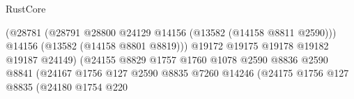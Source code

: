 \begin{lexlean}{RustCore}
\begin{coremodule}
                                                              (@28781
                                                                (@28791
                                                                  @28800
                                                                  @24129
                                                                  @14156
                                                                  (@13582 (@14158 @8811 @2590)))
                                                                @14156
                                                                (@13582 (@14158 @8801 @8819)))
                                                              @19172
                                                              @19175
                                                              @19178
                                                              @19182
                                                              @19187
                                                              @24149)
                                                            (@24155
                                                              @8829
                                                              @1757
                                                              @1760
                                                              @1078
                                                              @2590
                                                              @8836
                                                              @2590
                                                              @8841
                                                              (@24167
                                                                @1756
                                                                @127
                                                                @2590
                                                                @8835
                                                                @7260
                                                                @14246
                                                                (@24175
                                                                  @1756
                                                                  @127
                                                                  @8835
                                                                  (@24180
                                                                    @1754
                                                                    @220

\end{coremodule}
\end{lexlean}
